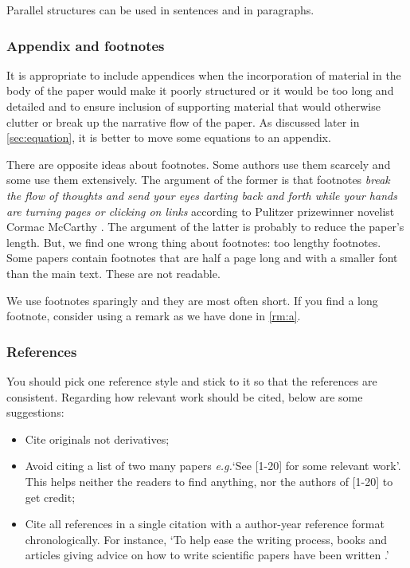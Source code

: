 \documentclass[authoryear,12pta4paper,fleqn]{article}
\newcommand{\eg}{\textit{e.g.}\xspace}
\numberwithin{equation}{section}
\theoremstyle{remark}
\begin{document}
Parallel structures can be used in sentences and in paragraphs. 

\subsubsection{Appendix and footnotes}\label{sec:appendix-footnotes}

It is appropriate to include appendices when
the incorporation of material in the body of the paper would make it poorly structured or it would be too long and detailed and to ensure inclusion of supporting material that would otherwise clutter or break up the narrative flow of the paper.
As discussed later in \cref{sec:equation}, it is better to move some equations to an appendix.

There are opposite ideas about footnotes. Some authors use them scarcely and some use them extensively. The argument of the former is that footnotes \textit{break the flow of thoughts and send your eyes darting back and forth while your hands are turning pages or clicking on links} according to Pulitzer prizewinner novelist Cormac McCarthy \citep{McCarthy}. The argument of the latter is probably to reduce the paper's length. But, we find one wrong thing about footnotes: too lengthy footnotes. Some papers contain footnotes that are half a page long and with a smaller font than the main text. These are not readable.

We use footnotes sparingly and they are most often short. If you find a long footnote, consider using a remark as we have done in \cref{rm:a}.

\subsubsection{References}\label{sec:references}

You should pick one reference style and stick to it so that the references are consistent. Regarding how relevant work should be cited, below are some suggestions:

\begin{itemize}
\item Cite originals not derivatives;
\item Avoid citing a list of two many papers \eg `See [1-20] for some relevant work'. This helps neither the readers to find anything, nor the authors of [1-20] to get credit;
\item Cite all references in a single citation with a author-year reference format   chronologically. For instance, `To help ease the writing process, books and articles giving advice on how to write scientific papers have been written \citep{day1998write,ashby2000write,plaxco2010art}.'
\end{itemize}
\end{document}
